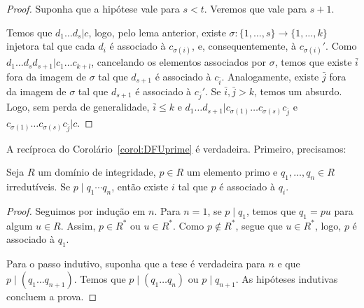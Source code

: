 \begin{proof}
Suponha que a hipótese vale para $s<t$. Veremos que vale para $s+1$.

Temos que $d_1\dots d_s|c$, logo, pelo lema anterior, existe $\sigma:\{1, \dots, s\}\rightarrow\{1, \dots, k\}$ injetora tal que cada $d_i$ é associado à $c_{\sigma(i)}$, e, consequentemente, à $c_{\sigma(i)}'$. Como $d_1\dots d_sd_{s+1}|c_1\dots c_{k+l}$, cancelando os elementos associados por $\sigma$, temos que existe $\bar i$ fora da imagem de $\sigma$ tal que $d_{s+1}$ é associado à $c_{\bar i}$. Analogamente, existe $\bar j$ fora da imagem de $\sigma$ tal que $d_{s+1}$ é associado à $c_{\bar j}'$. Se $\bar i, \bar j>k$, temos um absurdo. Logo, sem perda de generalidade, $\bar i\leq k$ e $d_1\dots d_{s+1}|c_{\sigma(1)}\dots c_{\sigma(s)}c_{\bar j}$ e $c_{\sigma(1)}\dots c_{\sigma(s)}c_{\bar j}|c$.
\end{proof}


A recíproca do Corolário~\ref{corol:DFUprime} é verdadeira. Primeiro, precisamos:

\begin{lemma}
Seja $R$ um domínio de integridade, $p\in R$ um elemento primo e $q_1, \dots, q_n\in R$ irredutíveis.
Se $p\mid q_1\cdots q_n$, então existe $i$ tal que $p$ é associado à $q_i$.
\end{lemma}
\begin{proof}
Seguimos por indução em $n$.
Para $n=1$, se $p\mid q_1$, temos que $q_1=pu$ para algum $u\in R$.
Assim, $p\in R^*$ ou $u\in R^*$.
Como $p \notin R^*$, segue que $u \in R^*$, logo, $p$ é associado à $q_1$.

Para o passo indutivo, suponha que a tese é verdadeira para $n$ e que $p\mid (q_1\dots q_{n+1})$.
Temos que $p\mid (q_1\dots q_{n})$ ou $p\mid q_{n+1}$.
As hipóteses indutivas concluem a prova.
\end{proof}

